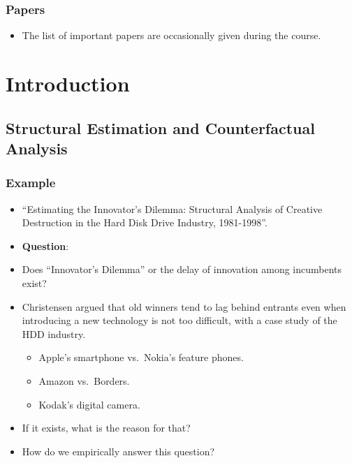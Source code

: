 \documentclass[]{book}
\providecommand{\tightlist}{%
  \setlength{\itemsep}{0pt}\setlength{\parskip}{0pt}}
\begin{document}
\subsection{Papers}\label{papers}

\begin{itemize}
\tightlist
\item
  The list of important papers are occasionally given during the course.
\end{itemize}

\chapter{Introduction}\label{intro}

\section{Structural Estimation and Counterfactual
Analysis}\label{structural-estimation-and-counterfactual-analysis}

\subsection{Example}\label{example}

\begin{itemize}
\item
  \citet{Igami2017} ``Estimating the Innovator's Dilemma: Structural
  Analysis of Creative Destruction in the Hard Disk Drive Industry,
  1981-1998''.
\item
  \textbf{Question}:
\item
  Does ``Innovator's Dilemma'' \citep{Christensen1997} or the delay of
  innovation among incumbents exist?
\item
  Christensen argued that old winners tend to lag behind entrants even
  when introducing a new technology is not too difficult, with a case
  study of the HDD industry.

  \begin{itemize}
  \tightlist
  \item
    Apple's smartphone vs.~Nokia's feature phones.
  \item
    Amazon vs.~Borders.
  \item
    Kodak's digital camera.
  \end{itemize}
\item
  If it exists, what is the reason for that?
\item
  How do we empirically answer this question?
\end{itemize}
\end{document}
